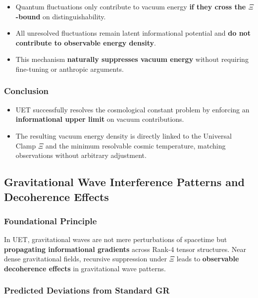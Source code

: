 \documentclass[12pt,a4paper]{article}
\begin{document}
\begin{itemize}
    \item Quantum fluctuations only contribute to vacuum energy \textbf{if they cross the \(\Xi\)-bound} on distinguishability.
    \item All unresolved fluctuations remain latent informational potential and \textbf{do not contribute to observable energy density}.
    \item This mechanism \textbf{naturally suppresses vacuum energy} without requiring fine-tuning or anthropic arguments.
\end{itemize}

\subsubsection*{Conclusion}

\begin{itemize}
    \item UET successfully resolves the cosmological constant problem by enforcing an \textbf{informational upper limit} on vacuum contributions.
    \item The resulting vacuum energy density is directly linked to the Universal Clamp \(\Xi\) and the minimum resolvable cosmic temperature, matching observations without arbitrary adjustment.
\end{itemize}
\subsection{Gravitational Wave Interference Patterns and Decoherence Effects}

\subsubsection*{Foundational Principle}

In UET, gravitational waves are not mere perturbations of spacetime but \textbf{propagating informational gradients} across Rank-4 tensor structures. Near dense gravitational fields, recursive suppression under \(\Xi\) leads to \textbf{observable decoherence effects} in gravitational wave patterns.

\subsubsection*{Predicted Deviations from Standard GR}
\end{document}
